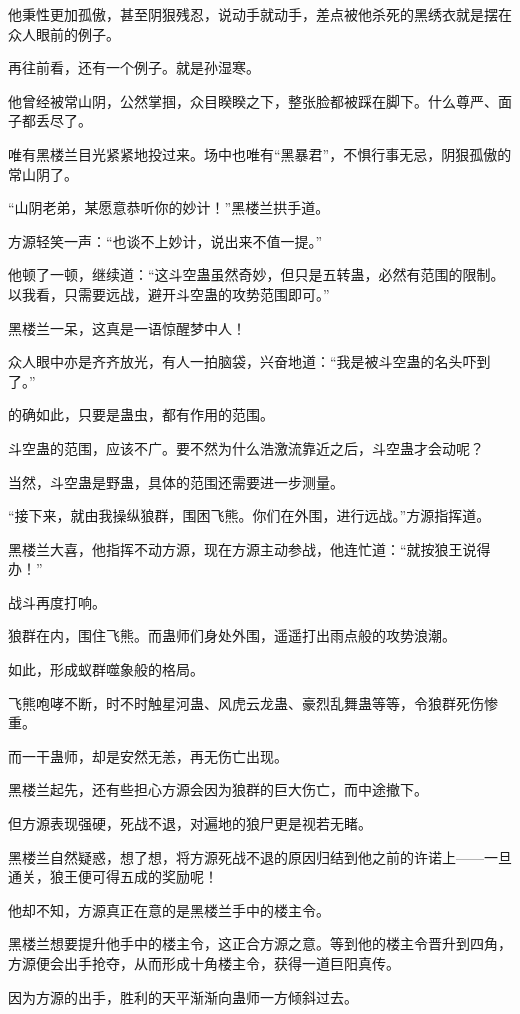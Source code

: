 \begin{this_body}
他秉性更加孤傲，甚至阴狠残忍，说动手就动手，差点被他杀死的黑绣衣就是摆在众人眼前的例子。

再往前看，还有一个例子。就是孙湿寒。

他曾经被常山阴，公然掌掴，众目睽睽之下，整张脸都被踩在脚下。什么尊严、面子都丢尽了。

唯有黑楼兰目光紧紧地投过来。场中也唯有“黑暴君”，不惧行事无忌，阴狠孤傲的常山阴了。

“山阴老弟，某愿意恭听你的妙计！”黑楼兰拱手道。

方源轻笑一声：“也谈不上妙计，说出来不值一提。”

他顿了一顿，继续道：“这斗空蛊虽然奇妙，但只是五转蛊，必然有范围的限制。以我看，只需要远战，避开斗空蛊的攻势范围即可。”

黑楼兰一呆，这真是一语惊醒梦中人！

众人眼中亦是齐齐放光，有人一拍脑袋，兴奋地道：“我是被斗空蛊的名头吓到了。”

的确如此，只要是蛊虫，都有作用的范围。

斗空蛊的范围，应该不广。要不然为什么浩激流靠近之后，斗空蛊才会动呢？

当然，斗空蛊是野蛊，具体的范围还需要进一步测量。

“接下来，就由我操纵狼群，围困飞熊。你们在外围，进行远战。”方源指挥道。

黑楼兰大喜，他指挥不动方源，现在方源主动参战，他连忙道：“就按狼王说得办！”

战斗再度打响。

狼群在内，围住飞熊。而蛊师们身处外围，遥遥打出雨点般的攻势浪潮。

如此，形成蚁群噬象般的格局。

飞熊咆哮不断，时不时触星河蛊、风虎云龙蛊、豪烈乱舞蛊等等，令狼群死伤惨重。

而一干蛊师，却是安然无恙，再无伤亡出现。

黑楼兰起先，还有些担心方源会因为狼群的巨大伤亡，而中途撤下。

但方源表现强硬，死战不退，对遍地的狼尸更是视若无睹。

黑楼兰自然疑惑，想了想，将方源死战不退的原因归结到他之前的许诺上——一旦通关，狼王便可得五成的奖励呢！

他却不知，方源真正在意的是黑楼兰手中的楼主令。

黑楼兰想要提升他手中的楼主令，这正合方源之意。等到他的楼主令晋升到四角，方源便会出手抢夺，从而形成十角楼主令，获得一道巨阳真传。

因为方源的出手，胜利的天平渐渐向蛊师一方倾斜过去。


\end{this_body}
